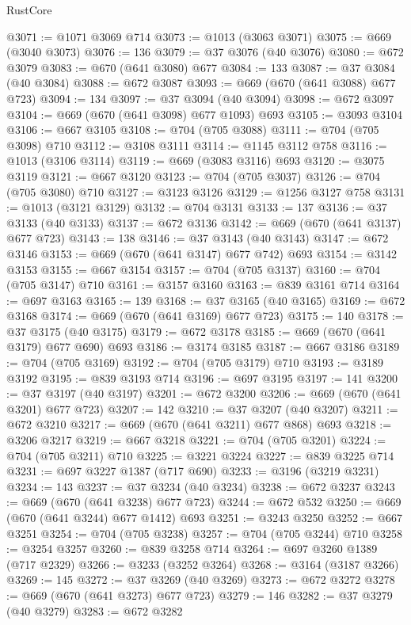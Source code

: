 \begin{lexlean}{RustCore}
\begin{coremodule}
@3071 := @1071 @3069 @714
@3073 := @1013 (@3063 @3071)
@3075 := @669 (@3040 @3073)
@3076 := 136
@3079 := @37 @3076 (@40 @3076)
@3080 := @672 @3079
@3083 := @670 (@641 @3080) @677
@3084 := 133
@3087 := @37 @3084 (@40 @3084)
@3088 := @672 @3087
@3093 := @669 (@670 (@641 @3088) @677 @723)
@3094 := 134
@3097 := @37 @3094 (@40 @3094)
@3098 := @672 @3097
@3104 := @669 (@670 (@641 @3098) @677 @1093) @693
@3105 := @3093 @3104
@3106 := @667 @3105
@3108 := @704 (@705 @3088)
@3111 := @704 (@705 @3098) @710
@3112 := @3108 @3111
@3114 := @1145 @3112 @758
@3116 := @1013 (@3106 @3114)
@3119 := @669 (@3083 @3116) @693
@3120 := @3075 @3119
@3121 := @667 @3120
@3123 := @704 (@705 @3037)
@3126 := @704 (@705 @3080) @710
@3127 := @3123 @3126
@3129 := @1256 @3127 @758
@3131 := @1013 (@3121 @3129)
@3132 := @704 @3131
@3133 := 137
@3136 := @37 @3133 (@40 @3133)
@3137 := @672 @3136
@3142 := @669 (@670 (@641 @3137) @677 @723)
@3143 := 138
@3146 := @37 @3143 (@40 @3143)
@3147 := @672 @3146
@3153 := @669 (@670 (@641 @3147) @677 @742) @693
@3154 := @3142 @3153
@3155 := @667 @3154
@3157 := @704 (@705 @3137)
@3160 := @704 (@705 @3147) @710
@3161 := @3157 @3160
@3163 := @839 @3161 @714
@3164 := @697 @3163
@3165 := 139
@3168 := @37 @3165 (@40 @3165)
@3169 := @672 @3168
@3174 := @669 (@670 (@641 @3169) @677 @723)
@3175 := 140
@3178 := @37 @3175 (@40 @3175)
@3179 := @672 @3178
@3185 := @669 (@670 (@641 @3179) @677 @690) @693
@3186 := @3174 @3185
@3187 := @667 @3186
@3189 := @704 (@705 @3169)
@3192 := @704 (@705 @3179) @710
@3193 := @3189 @3192
@3195 := @839 @3193 @714
@3196 := @697 @3195
@3197 := 141
@3200 := @37 @3197 (@40 @3197)
@3201 := @672 @3200
@3206 := @669 (@670 (@641 @3201) @677 @723)
@3207 := 142
@3210 := @37 @3207 (@40 @3207)
@3211 := @672 @3210
@3217 := @669 (@670 (@641 @3211) @677 @868) @693
@3218 := @3206 @3217
@3219 := @667 @3218
@3221 := @704 (@705 @3201)
@3224 := @704 (@705 @3211) @710
@3225 := @3221 @3224
@3227 := @839 @3225 @714
@3231 := @697 @3227 @1387 (@717 @690)
@3233 := @3196 (@3219 @3231)
@3234 := 143
@3237 := @37 @3234 (@40 @3234)
@3238 := @672 @3237
@3243 := @669 (@670 (@641 @3238) @677 @723)
@3244 := @672 @532
@3250 := @669 (@670 (@641 @3244) @677 @1412) @693
@3251 := @3243 @3250
@3252 := @667 @3251
@3254 := @704 (@705 @3238)
@3257 := @704 (@705 @3244) @710
@3258 := @3254 @3257
@3260 := @839 @3258 @714
@3264 := @697 @3260 @1389 (@717 @2329)
@3266 := @3233 (@3252 @3264)
@3268 := @3164 (@3187 @3266)
@3269 := 145
@3272 := @37 @3269 (@40 @3269)
@3273 := @672 @3272
@3278 := @669 (@670 (@641 @3273) @677 @723)
@3279 := 146
@3282 := @37 @3279 (@40 @3279)
@3283 := @672 @3282

\end{coremodule}
\end{lexlean}
